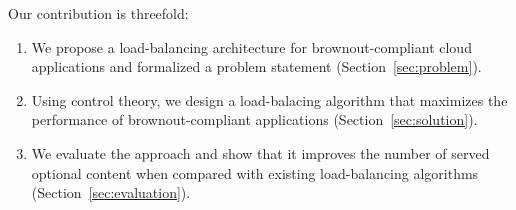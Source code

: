 Our contribution is threefold:
\begin{enumerate}
	\item We propose a load-balancing architecture for brownout-compliant cloud applications and formalized a problem statement (Section~\ref{sec:problem}).
	\item Using control theory, we design a load-balacing algorithm that maximizes the performance of brownout-compliant applications (Section~\ref{sec:solution}).
	\item We evaluate the approach and show that it improves the number of served optional content when compared with existing load-balancing algorithms (Section~\ref{sec:evaluation}).
\end{enumerate}

